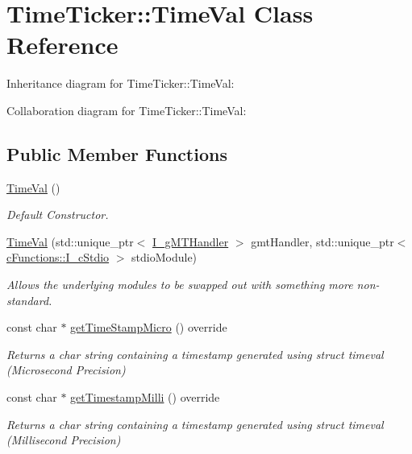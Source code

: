\hypertarget{classTimeTicker_1_1TimeVal}{}\section{Time\+Ticker\+::Time\+Val Class Reference}
\label{classTimeTicker_1_1TimeVal}


Inheritance diagram for Time\+Ticker\+::Time\+Val\+:


Collaboration diagram for Time\+Ticker\+::Time\+Val\+:
\subsection*{Public Member Functions}
\begin{DoxyCompactItemize}
\item 
\mbox{\label{classTimeTicker_1_1TimeVal_a9fe049b689b43d8f5ab38ee703d6a18a}} 
\mbox{\hyperlink{classTimeTicker_1_1TimeVal_a9fe049b689b43d8f5ab38ee703d6a18a}{Time\+Val}} ()
\begin{DoxyCompactList}\small\item\em Default Constructor. \end{DoxyCompactList}\item 
\mbox{\hyperlink{classTimeTicker_1_1TimeVal_a21338e34d06fba75217223f8239c2c20}{Time\+Val}} (std\+::unique\+\_\+ptr$<$ \mbox{\hyperlink{classTimeTicker_1_1I__gMTHandler}{I\+\_\+g\+M\+T\+Handler}} $>$ gmt\+Handler, std\+::unique\+\_\+ptr$<$ \mbox{\hyperlink{classcFunctions_1_1I__cStdio}{c\+Functions\+::\+I\+\_\+c\+Stdio}} $>$ stdio\+Module)
\begin{DoxyCompactList}\small\item\em Allows the underlying modules to be swapped out with something more non-\/standard. \end{DoxyCompactList}\item 
const char $\ast$ \mbox{\hyperlink{classTimeTicker_1_1TimeVal_a7f874b58b0af4de06be9426ab43f3a0d}{get\+Time\+Stamp\+Micro}} () override
\begin{DoxyCompactList}\small\item\em Returns a char string containing a timestamp generated using struct timeval (Microsecond Precision) \end{DoxyCompactList}\item 
const char $\ast$ \mbox{\hyperlink{classTimeTicker_1_1TimeVal_a9a5456bb38407bc436649431e3f026b1}{get\+Timestamp\+Milli}} () override
\begin{DoxyCompactList}\small\item\em Returns a char string containing a timestamp generated using struct timeval (Millisecond Precision) \end{DoxyCompactList}\item 

\end{DoxyCompactItemize}
